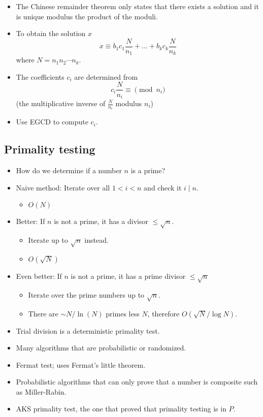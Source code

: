 \documentclass[12pt,t]{beamer}
\newcommand{\bi}{\begin{itemize}}
\newcommand{\ei}{\end{itemize}}
\begin{document}
\begin{frame}
  \vspace{10pt}
  \bi
    \item The Chinese remainder theorem only states that there exists a solution and it
  is unique modulus the product of the moduli. \\
    \item To obtain the solution $x$
      \[
        x \equiv b_1 c_1 \frac{N}{n_1} + \ldots + b_k c_k \frac{N}{n_k}
      \]
      where $N = n_1 n_2 \cdots n_k$.
    \item The coefficients $c_i$ are determined from
      \[
        c_i \frac{N}{n_i} \equiv \pmod{n_i}
      \]
      (the multiplicative inverse of $\frac{N}{n_i}$ modulus $n_i$)
    \item Use EGCD to compute $c_i$.
  \ei
\end{frame}

\subsection{Primality testing}
\begin{frame}
  \vspace{20pt}
  \bi
    \item How do we determine if a number $n$ is a prime?
    \item {\color{title}Naive method:} Iterate over all $1 < i < n$ and check it
      $i \mid n$.
      \bi
        \item  $O(N)$
      \ei
    \item {\color{title}Better:} If $n$ is not a prime, it has a divisor $\leq \sqrt{n}$.
      \bi
        \item Iterate up to $\sqrt{n}$ instead.
        \item $O(\sqrt{N})$
      \ei
    \item {\color{title}Even better:} If $n$ is not a prime, it has a prime divisor $\leq \sqrt{n}$
      \bi
        \item Iterate over the prime numbers up to $\sqrt{n}$.
        \item There are $\sim N/\ln(N)$ primes less $N$, therefore $O(\sqrt{N}/\log N)$.
      \ei
  \ei
\end{frame}

\begin{frame}
  \vspace{40pt}
  \bi
    \item Trial division is a deterministic primality test.
    \item Many algorithms that are probabilistic or randomized.
    \item Fermat test; uses Fermat's little theorem.
    \item Probabilistic algorithms that can only prove that a number is
      composite such as Miller-Rabin.
    \item AKS primality test, the one that proved that primality testing is in
      $P$.
  \ei
\end{frame}
\end{document}
